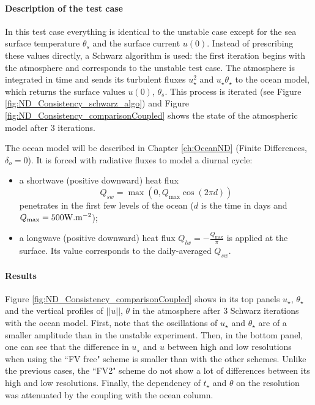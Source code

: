 \paragraph{Description of the test case}
In this test case everything is identical to the
unstable case except for the sea surface temperature
$\theta_s$ and the surface current $u(0)$.
Instead of prescribing these values directly,
a Schwarz algorithm is used: the first iteration
begins with the atmosphere and corresponds to
the unstable test case.
The atmosphere is integrated in time
and sends its turbulent fluxes $u_\star^2$ and
$u_\star \theta_\star$ to the ocean model, which
returns the surface values $u(0)$, $\theta_s$.
This process is iterated (see Figure
\ref{fig:ND_Consistency_schwarz_algo}) and
Figure \ref{fig:ND_Consistency_comparisonCoupled} shows
the state of the atmospheric model after 3 iterations.
\par
The ocean model will be described in Chapter
\ref{ch:OceanND} (Finite Differences, $\delta_o=0$).
It is forced with radiative fluxes
to model a diurnal cycle:
\begin{itemize}
\item
	a shortwave (positive downward) heat flux
	\begin{equation}
		Q_{sw}=\max(0,Q_{\max} \cos(2\pi d))
	\end{equation}
	penetrates in the first few levels of the ocean ($d$ is
	the time in days and $Q_{\max} = 500 {\rm W}.{\rm m}^{-2}$);
\item  a longwave (positive downward) heat flux
	$Q_{lw} = -\frac{Q_{\max}}{\pi}$ is applied at the surface.
	Its value corresponds to the daily-averaged $Q_{sw}$.
\end{itemize}
\paragraph{Results}
Figure \ref{fig:ND_Consistency_comparisonCoupled}
shows in its top panels $u_\star$, $\theta_\star$ and
the vertical profiles of $||u||$, $\theta$ in the atmosphere
after 3 Schwarz iterations with the ocean model.
First, note that the oscillations of $u_\star$ and $\theta_\star$
are of a smaller amplitude than in the unstable experiment.
Then, in the bottom panel, one can see that the difference
in $u_\star$ and $u$ between high and low resolutions when using
the ``FV free" scheme is smaller than with the other schemes.
Unlike the previous cases, the ``FV2"
scheme do not show a lot of differences between
its high and low resolutions.
Finally, the dependency of $t_\star$ and $\theta$ on the resolution
was attenuated by the coupling with the ocean column.
